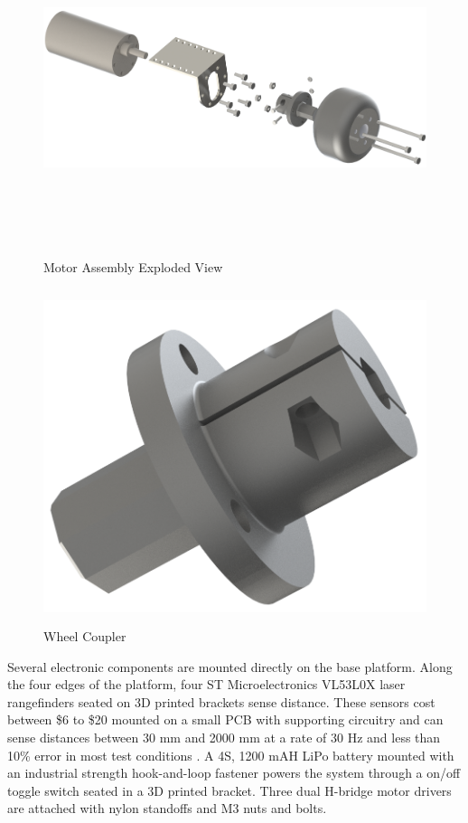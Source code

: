 \begin{figure}[H]   %
	\centering \includegraphics[width=6in, height=3.85in, keepaspectratio]{figures/motor_assem_explode.png}
	\caption{Motor Assembly Exploded View}	\label{fig:motor_assem_explode}
\end{figure}
\begin{figure}[H]   %
	\centering \includegraphics[width=6in, height=3.85in, keepaspectratio]{figures/wheel_coupler.png}
	\caption{Wheel Coupler}	\label{fig:wheel_coupler}
\end{figure}

Several electronic components are mounted directly on the base platform. Along the four edges of the platform, four ST Microelectronics VL53L0X laser rangefinders seated on 3D printed brackets sense distance. These sensors cost between \$6 to \$20 mounted on a small PCB with supporting circuitry and can sense distances between 30 mm and 2000 mm at a rate of 30 Hz and less than 10\% error in most test conditions \cite{vl53l0x_datasheet}. A 4S, 1200 mAH LiPo battery mounted with an industrial strength hook-and-loop fastener powers the system through a on/off toggle switch seated in a 3D printed bracket. Three dual H-bridge motor drivers are attached with nylon standoffs and M3 nuts and bolts.

